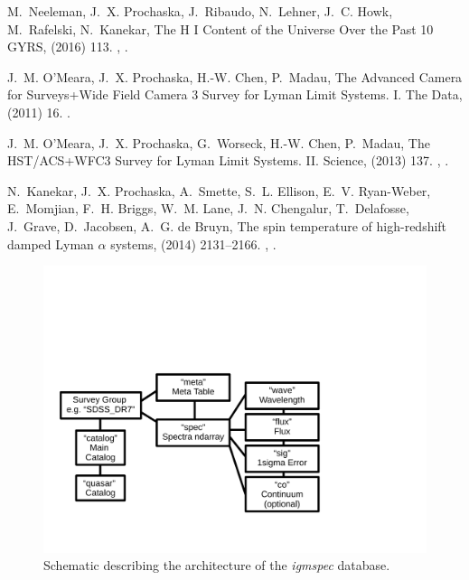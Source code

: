 \documentclass[12pt]{elsarticle}
\begin{document}
\begin{thebibliography}{10}
M.~{Neeleman}, J.~X. {Prochaska}, J.~{Ribaudo}, N.~{Lehner}, J.~C. {Howk},
  M.~{Rafelski}, N.~{Kanekar}, {The H I Content of the Universe Over the Past
  10 GYRS},  (2016) 113.
\newblock \href {http://arxiv.org/abs/1601.01691} {},
  \href {http://dx.doi.org/10.3847/0004-637X/818/2/113}
  {}.

J.~M. {O'Meara}, J.~X. {Prochaska}, H.-W. {Chen}, P.~{Madau}, {The Advanced
  Camera for Surveys+Wide Field Camera 3 Survey for Lyman Limit Systems. I. The
  Data},  (2011) 16.
\newblock \href {http://dx.doi.org/10.1088/0067-0049/195/2/16}
  {}.

J.~M. {O'Meara}, J.~X. {Prochaska}, G.~{Worseck}, H.-W. {Chen}, P.~{Madau},
  {The HST/ACS+WFC3 Survey for Lyman Limit Systems. II. Science}, 
  (2013) 137.
\newblock \href {http://arxiv.org/abs/1204.3093} {},
  \href {http://dx.doi.org/10.1088/0004-637X/765/2/137}
  {}.

N.~{Kanekar}, J.~X. {Prochaska}, A.~{Smette}, S.~L. {Ellison}, E.~V.
  {Ryan-Weber}, E.~{Momjian}, F.~H. {Briggs}, W.~M. {Lane}, J.~N. {Chengalur},
  T.~{Delafosse}, J.~{Grave}, D.~{Jacobsen}, A.~G. {de Bruyn}, {The spin
  temperature of high-redshift damped Lyman {$\alpha$} systems}, 
  (2014) 2131--2166.
\newblock \href {http://arxiv.org/abs/1312.3640} {},
  \href {http://dx.doi.org/10.1093/mnras/stt2338}
  {}.

\end{thebibliography}



%
%


\begin{figure}
\includegraphics[width=6in]{architecture_v02.pdf}
\caption{Schematic describing the architecture of 
the {\it igmspec} database.
}
\label{fig:arch}
\end{figure}
\end{document}
